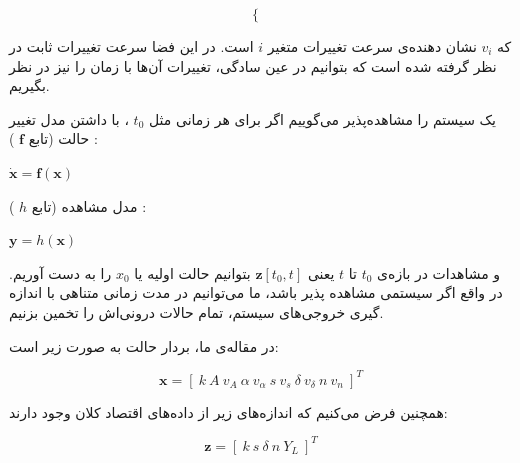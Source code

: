\documentclass[11pt, fleqn]{article}
\begin{document}
\begin{multicols}{2}
\begin{LTR}
\begin{equation}
\begin{cases}
\end{cases}
\end{equation}
\end{LTR}


که 
$v_i$
 نشان دهنده‌ی سرعت تغییرات متغیر $i$
 است. در این فضا سرعت تغییرات ثابت در نظر گرفته شده است که بتوانیم در عین سادگی، تغییرات آن‌ها با زمان را نیز در نظر بگیریم. 


















	یک سیستم را مشاهده‌پذیر می‌گوییم اگر برای هر زمانی مثل 
$t_0$
،
	 با داشتن مدل تغییر حالت
(تابع 
$\mathbf{f}$
)
:

\begin{latin}
$\mathbf{\dot{x}} = \mathbf{f}(\mathbf{x})$
\end{latin}

 مدل مشاهده
(تابع 
$h$
)
:

\begin{latin}
$\mathbf{y} = h(\mathbf{x})$
\end{latin}

و مشاهدات در بازه‌ی 
$t_0$
 تا 
 $t$
  یعنی
$\mathbf{z}[t_0, t]$
 بتوانیم حالت اولیه یا 
 $x_0$
 را به دست آوریم. در واقع اگر سیستمی مشاهده‌ پذیر باشد، ما می‌توانیم در مدت زمانی متناهی با اندازه گیری خروجی‌های سیستم، تمام حالات درونی‌اش را تخمین بزنیم.  
 
	در مقاله‌ی ما، بردار حالت به صورت زیر است:

\useshortskip
\begin{LTR}
\begin{equation}
\mathbf{x} = [\ k \ A \ v_A \  \alpha \  v_\alpha \  s \ v_s  \ \delta \  v_\delta \ n \  v_n \ ]^T
\end{equation} 
\end{LTR}

همچنین فرض می‌کنیم که اندازه‌های زیر از داده‌های اقتصاد کلان وجود دارند:

\useshortskip
\begin{LTR}
\begin{equation}
\mathbf{z} = [\ k \ s \ \delta \ n \ Y_L \ ]^T
\end{equation}
\end{LTR}



\end{multicols}
\end{document}
